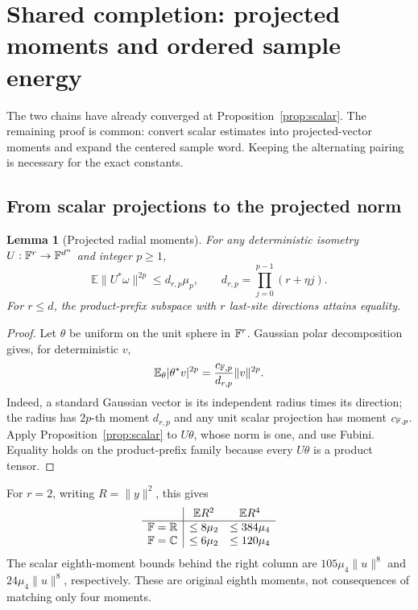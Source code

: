 \documentclass[11pt]{article}
\numberwithin{equation}{section}
\newtheorem{lemma}[theorem]{Lemma}
\theoremstyle{definition}\newtheorem{definition}[theorem]{Definition}
\theoremstyle{remark}\newtheorem{remark}[theorem]{Remark}
\newcommand{\R}{\mathbb R}\newcommand{\E}{\mathbb E}\newcommand{\Prob}{\mathbb P}
\newcommand{\norm}[1]{\lVert#1\rVert}\newcommand{\ip}[2]{\langle#1,#2\rangle}
\newcommand{\C}{\mathbb C}
\begin{document}
\par{}
\section{Shared completion: projected moments and ordered sample energy}\label{sec:shared}
\begin{takeaway}
The two chains have already converged at Proposition~\ref{prop:scalar}.
The remaining proof is common: convert scalar estimates into projected-vector
moments and expand the centered sample word. Keeping the alternating pairing
is necessary for the exact constants.
\end{takeaway}

\subsection{From scalar projections to the projected norm}
\begin{lemma}[Projected radial moments]\label{lem:radial}
For any deterministic isometry $U:\mathbb F^r\to\mathbb F^{d^n}$ and integer $p\ge1$,
\begin{equation}\label{eq:radial}
 \E\norm{U^*\omega}^{2p}\le d_{r,p}\mu_p,
 \qquad d_{r,p}=\prod_{j=0}^{p-1}(r+\eta j).
\end{equation}
For $r\le d$, the product-prefix subspace with $r$ last-site directions
attains equality.
\end{lemma}
\begin{proof}
Let $\theta$ be uniform on the unit sphere in $\mathbb F^r$. Gaussian polar
decomposition gives, for deterministic $v$,
\[
 \E_\theta|\theta^*v|^{2p}=\frac{c_{\F,p}}{d_{r,p}}\norm v^{2p}.
\]
Indeed, a standard Gaussian vector is its independent radius times its
direction; the radius has $2p$-th moment $d_{r,p}$ and any unit scalar
projection has moment $c_{\mathbb F,p}$.
Apply Proposition~\ref{prop:scalar} to $U\theta$, whose norm is one, and use
Fubini. Equality holds on the product-prefix family because every $U\theta$
is a product tensor.
\end{proof}

For $r=2$, writing $R=\norm y^2$, this gives
\begin{equation}\label{eq:radial2}
 \begin{array}{c|cc}
 &\E R^2&\E R^4\\ \hline
 \F=\R&\le8\mu_2&\le384\mu_4\\
 \F=\C&\le6\mu_2&\le120\mu_4
 \end{array}
\end{equation}
The scalar eighth-moment bounds behind the right column are $105\mu_4\norm u^8$
and $24\mu_4\norm u^8$, respectively. These are original eighth moments,
not consequences of matching only four moments.
\end{document}
